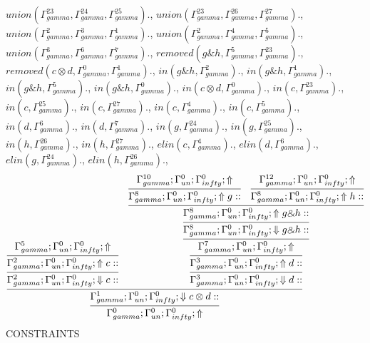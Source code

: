 \documentclass[a4paper, 11pt]{article}
\begin{document}
$union(\Gamma_{gamma}^{23}, \Gamma_{gamma}^{24}, \Gamma_{gamma}^{25}).$, $union(\Gamma_{gamma}^{23}, \Gamma_{gamma}^{26}, \Gamma_{gamma}^{27}).$, $union(\Gamma_{gamma}^{2}, \Gamma_{gamma}^{3}, \Gamma_{gamma}^{1}).$, $union(\Gamma_{gamma}^{2}, \Gamma_{gamma}^{4}, \Gamma_{gamma}^{5}).$, $union(\Gamma_{gamma}^{3}, \Gamma_{gamma}^{6}, \Gamma_{gamma}^{7}).$, $removed(g \binampersand h, \Gamma_{gamma}^{5}, \Gamma_{gamma}^{23}).$, $removed(c \otimes d, \Gamma_{gamma}^{0}, \Gamma_{gamma}^{1}).$, $in(g \binampersand h, \Gamma_{gamma}^{2}).$, $in(g \binampersand h, \Gamma_{gamma}^{1}).$, $in(g \binampersand h, \Gamma_{gamma}^{5}).$, $in(g \binampersand h, \Gamma_{gamma}^{0}).$, $in(c \otimes d, \Gamma_{gamma}^{0}).$, $in(c, \Gamma_{gamma}^{23}).$, $in(c, \Gamma_{gamma}^{25}).$, $in(c, \Gamma_{gamma}^{27}).$, $in(c, \Gamma_{gamma}^{4}).$, $in(c, \Gamma_{gamma}^{5}).$, $in(d, \Gamma_{gamma}^{6}).$, $in(d, \Gamma_{gamma}^{7}).$, $in(g, \Gamma_{gamma}^{24}).$, $in(g, \Gamma_{gamma}^{25}).$, $in(h, \Gamma_{gamma}^{26}).$, $in(h, \Gamma_{gamma}^{27}).$, $elin(c, \Gamma_{gamma}^{4}).$, $elin(d, \Gamma_{gamma}^{6}).$, $elin(g, \Gamma_{gamma}^{24}).$, $elin(h, \Gamma_{gamma}^{26}).$, 
\[
\infer{\Gamma_{ gamma}^{0} ; \Gamma_{un}^{0} ; \Gamma_{ infty}^{0} ;  \Uparrow }
{\infer{\Gamma_{ gamma}^{1} ; \Gamma_{un}^{0} ; \Gamma_{ infty}^{0} ;  \Downarrow c \otimes d :: }
{\infer{\Gamma_{ gamma}^{2} ; \Gamma_{un}^{0} ; \Gamma_{ infty}^{0} ;  \Downarrow c :: }
{\infer{\Gamma_{ gamma}^{2} ; \Gamma_{un}^{0} ; \Gamma_{ infty}^{0} ;  \Uparrow c :: }
{\Gamma_{ gamma}^{5} ; \Gamma_{un}^{0} ; \Gamma_{ infty}^{0} ;  \Uparrow }}
&
\infer{\Gamma_{ gamma}^{3} ; \Gamma_{un}^{0} ; \Gamma_{ infty}^{0} ;  \Downarrow d :: }
{\infer{\Gamma_{ gamma}^{3} ; \Gamma_{un}^{0} ; \Gamma_{ infty}^{0} ;  \Uparrow d :: }
{\infer{\Gamma_{ gamma}^{7} ; \Gamma_{un}^{0} ; \Gamma_{ infty}^{0} ;  \Uparrow }
{\infer{\Gamma_{ gamma}^{8} ; \Gamma_{un}^{0} ; \Gamma_{ infty}^{0} ;  \Downarrow g \binampersand h :: }
{\infer{\Gamma_{ gamma}^{8} ; \Gamma_{un}^{0} ; \Gamma_{ infty}^{0} ;  \Uparrow g \binampersand h :: }
{\infer{\Gamma_{ gamma}^{8} ; \Gamma_{un}^{0} ; \Gamma_{ infty}^{0} ;  \Uparrow g :: }
{\Gamma_{ gamma}^{10} ; \Gamma_{un}^{0} ; \Gamma_{ infty}^{0} ;  \Uparrow }
&
\infer{\Gamma_{ gamma}^{8} ; \Gamma_{un}^{0} ; \Gamma_{ infty}^{0} ;  \Uparrow h :: }
{\Gamma_{ gamma}^{12} ; \Gamma_{un}^{0} ; \Gamma_{ infty}^{0} ;  \Uparrow }}}}}}}}
\]
CONSTRAINTS
\end{document}
